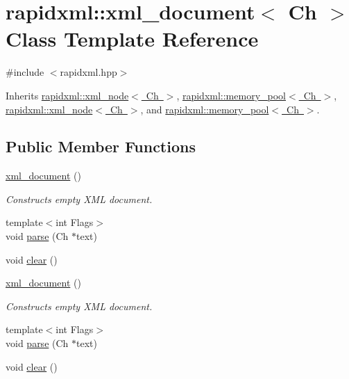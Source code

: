\hypertarget{classrapidxml_1_1xml__document}{}\section{rapidxml\+:\+:xml\+\_\+document$<$ Ch $>$ Class Template Reference}
\label{classrapidxml_1_1xml__document}


{\ttfamily \#include $<$rapidxml.\+hpp$>$}



Inherits \mbox{\hyperlink{classrapidxml_1_1xml__node}{rapidxml\+::xml\+\_\+node$<$ Ch $>$}}, \mbox{\hyperlink{classrapidxml_1_1memory__pool}{rapidxml\+::memory\+\_\+pool$<$ Ch $>$}}, \mbox{\hyperlink{classrapidxml_1_1xml__node}{rapidxml\+::xml\+\_\+node$<$ Ch $>$}}, and \mbox{\hyperlink{classrapidxml_1_1memory__pool}{rapidxml\+::memory\+\_\+pool$<$ Ch $>$}}.

\subsection*{Public Member Functions}
\begin{DoxyCompactItemize}
\item 
\mbox{\hyperlink{classrapidxml_1_1xml__document_aae8841b15085ba8f32ff46587ace28f5}{xml\+\_\+document}} ()
\begin{DoxyCompactList}\small\item\em Constructs empty X\+ML document. \end{DoxyCompactList}\item 
{\footnotesize template$<$int Flags$>$ }\\void \mbox{\hyperlink{classrapidxml_1_1xml__document_ac6e73ff9ac323bf5a370c38feb03a6b1}{parse}} (Ch $\ast$text)
\item 
void \mbox{\hyperlink{classrapidxml_1_1xml__document_a826929ff54242532198701f19ff5f83f}{clear}} ()
\item 
\mbox{\hyperlink{classrapidxml_1_1xml__document_aae8841b15085ba8f32ff46587ace28f5}{xml\+\_\+document}} ()
\begin{DoxyCompactList}\small\item\em Constructs empty X\+ML document. \end{DoxyCompactList}\item 
{\footnotesize template$<$int Flags$>$ }\\void \mbox{\hyperlink{classrapidxml_1_1xml__document_ac6e73ff9ac323bf5a370c38feb03a6b1}{parse}} (Ch $\ast$text)
\item 
void \mbox{\hyperlink{classrapidxml_1_1xml__document_a826929ff54242532198701f19ff5f83f}{clear}} ()
\end{DoxyCompactItemize}
